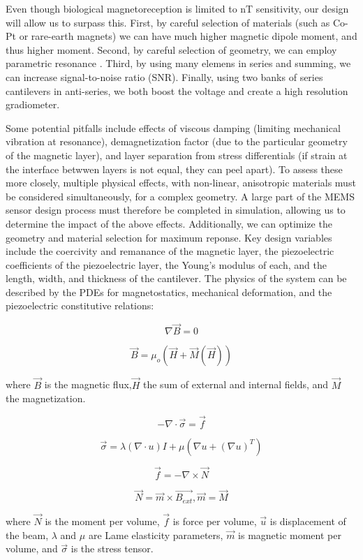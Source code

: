  Even though biological magnetoreception is limited to nT sensitivity, our design will allow us to surpass this. First, by careful selection of materials (such as Co-Pt or rare-earth magnets) \cite{coey2010magnetism, arnold2009permanent} we can have much higher magnetic dipole moment, and thus higher moment. Second, by careful selection of geometry, we can employ parametric resonance \cite{van2006resonant}. Third, by using many elemens in series and summing, we can increase signal-to-noise ratio (SNR). Finally, using two banks of series cantilevers in anti-series, we both boost the voltage and create a high resolution gradiometer.

 Some potential pitfalls include effects of viscous damping (limiting mechanical vibration at resonance), demagnetization factor (due to the particular geometry of the magnetic layer), and layer separation from stress differentials (if strain at the interface betwwen layers is not equal, they can peel apart). To assess these more closely, multiple physical effects, with non-linear, anisotropic materials must be considered simultaneously, for a complex geometry. A large part of the MEMS sensor design process must therefore be completed in simulation, allowing us to determine the impact of the above effects. Additionally, we can optimize the geometry and material selection for maximum reponse. Key design variables include the coercivity and remanance of the magnetic layer, the piezoelectric coefficients of the piezoelectric layer, the Young's modulus of each, and the length, width, and thickness of the cantilever. The physics of the system can be described by the PDEs for magnetostatics, mechanical deformation, and the piezoelectric constitutive relations:

 $$ \nabla \vec{B} = 0$$

 $$ \vec{B} = \mu_o(\vec{H}+\vec{M}(\vec{H}))$$

where $\vec{B}$ is the magnetic flux,$\vec{H}$ the sum of external and internal fields, and $\vec{M}$ the magnetization.
 
 $$ -\nabla\cdot\vec{\sigma}=\vec{f}$$
 
 $$ \vec{\sigma} = \lambda(\nabla\cdot u)I+\mu(\nabla u +(\nabla u)^T)$$

 $$ \vec{f} = -\nabla\times\vec{N}$$
 
$$ \vec{N} = \vec{m} \times \vec{B_{ext}}, \vec{m} = \vec{M} $$

where $\vec{N}$ is the moment per volume, $\vec{f}$ is force per volume, $\vec{u}$ is displacement of the beam, $\lambda$ and $\mu$ are Lame elasticity parameters, $\vec{m}$ is magnetic moment per volume, and $\vec{\sigma}$ is the stress tensor.

